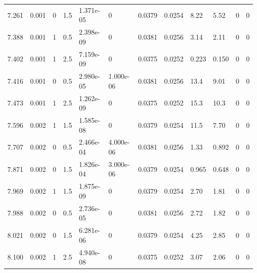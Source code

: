 \documentclass[preview]{standalone}
\begin{document}
{{{\begin{tabular}{L{1.2cm}C{1.2cm} C{0.3cm}C{0.5cm} C{1.4cm}C{1.4cm} C{1.4cm}C{1.4cm} C{1.6cm}C{1.6cm} C{1.6cm}C{1.6cm}}
  7.261  &  0.001  & 0     & 1.5 &  1.371e-05  & 0  &  0.0379&   0.0254& 8.22 & 5.52   &  0 & 0  \\ 
  7.388  &  0.001  & 1     & 0.5 &  2.398e-09  & 0  &  0.0381&   0.0256& 3.14 & 2.11   &  0 & 0  \\ 
  7.402  &  0.001  & 1     & 2.5 &  7.159e-09  & 0  &  0.0375&   0.0252& 0.223 & 0.150   &  0 & 0  \\ 
  7.416  &  0.001  & 0     & 0.5 &  2.980e-05  & 1.000e-06  &  0.0381&   0.0256& 13.4 & 9.01   &  0 & 0  \\ 
  7.473  &  0.001  & 1     & 2.5 &  1.262e-09  & 0  &  0.0375&   0.0252& 15.3 & 10.3   &  0 & 0  \\ 
  7.596  &  0.002  & 1     & 1.5 &  1.585e-08  & 0  &  0.0379&   0.0254& 11.5 & 7.70   &  0 & 0  \\ 
  7.707  &  0.002  & 0     & 0.5 &  2.466e-04  & 4.000e-06  &  0.0381&   0.0256& 1.33 & 0.892   &  0 & 0  \\ 
  7.871  &  0.002  & 0     & 1.5 &  1.826e-04  & 3.000e-06  &  0.0379&   0.0254& 0.965 & 0.648   &  0 & 0  \\ 
  7.969  &  0.002  & 1     & 1.5 &  1.875e-09  & 0  &  0.0379&   0.0254& 2.70 & 1.81   &  0 & 0  \\ 
  7.988  &  0.002  & 0     & 0.5 &  2.736e-05  & 0  &  0.0381&   0.0256& 2.72 & 1.82   &  0 & 0  \\ 
  8.021  &  0.002  & 0     & 1.5 &  6.281e-06  & 0  &  0.0379&   0.0254& 4.25 & 2.85   &  0 & 0  \\ 
  8.100  &  0.002  & 1     & 2.5 &  4.940e-08  & 0  &  0.0375&   0.0252& 3.07 & 2.06   &  0 & 0  \\ 
\hline 
\end{tabular} 

}}}
\end{document}
